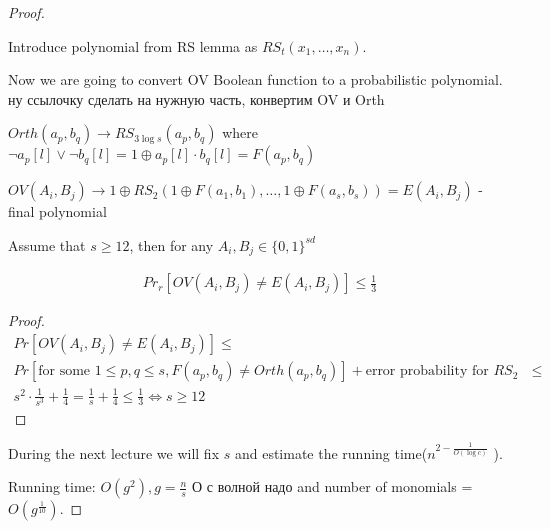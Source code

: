 \begin{proof}
\begin{lm}
		Introduce polynomial from RS lemma as $RS_t(x_1, \dots, x_n)$.

		Now we are going to convert OV Boolean function to a probabilistic polynomial.
		{\color{red} ну ссылочку сделать на нужную часть, конвертим OV и Orth}

		$Orth(a_p, b_q) \to RS_{3 \log s}(a_p, b_q)$ where $\neg a_p[l] \lor \neg b_q[l] = 1 \oplus a_p[l] \cdot b_q[l] = F(a_p, b_q)$

		$OV(A_i, B_j) \to 1 \oplus RS_2(1 \oplus F(a_1, b_1), \dots, 1 \oplus F(a_s, b_s)) = E(A_i, B_j)$ - final polynomial

		\begin{lm}

			Assume that $s \geq 12$, then for any $A_i, B_j \in \{0, 1\}^{sd}$

			\begin{align*}
				Pr_r[OV(A_i, B_j) \neq E(A_i, B_j)] \leq \frac{1}{3}
			\end{align*}

		\end{lm}

		\begin{proof}
			\begin{align*}
				Pr[OV(A_i, B_j) \neq E(A_i, B_j)] \leq \\ Pr[\text{for some }1 \leq p, q \leq s, F(a_p, b_q) \neq Orth(a_p, b_q)] + \text{error probability for $RS_2$ } \leq \\ s^2 \cdot \frac{1}{s^3} + \frac{1}{4} = \frac{1}{s} + \frac{1}{4} \leq \frac{1}{3} \Leftrightarrow s \geq 12
			\end{align*}
		\end{proof}



	\end{lm}


	During the next lecture we will fix $s$ and estimate the running time($n^{2-\frac{1}{O(\log c)}}$ ).

	Running time: $O(g^2), g=\frac{n}{s}$ {\color{red} О с волной надо} and number of monomials = $O(g^{\frac{1}{10}})$.


\end{proof}
